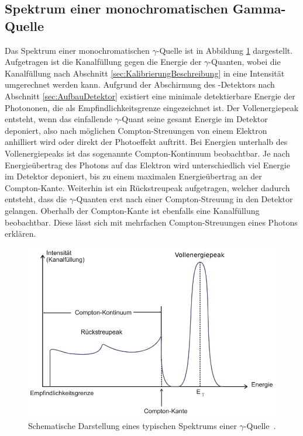 \subsection{Spektrum einer monochromatischen Gamma-Quelle}
\label{sec:TypischeQuelle}

Das Spektrum einer monochromatischen $\gamma$-Quelle ist in Abbildung \ref{fig:typisches-Spektrum}
dargestellt. Aufgetragen ist die Kanalfüllung gegen die Energie der $\gamma$-Quanten, wobei
die Kanalfüllung nach Abschnitt \ref{sec:KalibrierungBeschreibung} in eine Intensität umgerechnet werden kann.
Aufgrund der Abschirmung des -Detektors nach Abschnitt \ref{sec:AufbauDetektor} existiert eine
minimale detektierbare Energie der Photononen, die als Empfindlichkeitsgrenze eingezeichnet ist.
Der Vollenergiepeak entsteht, wenn das einfallende $\gamma$-Quant seine gesamt Energie im Detektor
deponiert, also nach möglichen Compton-Streuungen von einem Elektron anhilliert wird oder direkt der
Photoeffekt auftritt.
Bei Energien unterhalb des Vollenergiepeaks ist das sogenannte Compton-Kontinuum beobachtbar. Je nach
Energieübertrag des Photons auf das Elektron wird unterschiedlich viel Energie im Detektor deponiert,
bis zu einem maximalen Energieübertrag an der Compton-Kante.
Weiterhin ist ein Rückstreupeak aufgetragen, welcher dadurch entsteht, dass die $\gamma$-Quanten erst
nach einer Compton-Streuung in den Detektor gelangen.
Oberhalb der Compton-Kante ist ebenfalls eine Kanalfüllung beobachtbar. Diese lässt sich mit mehrfachen
Compton-Streuungen eines Photons erklären.

\begin{figure}
	\centering
	\includegraphics[width=.8\textwidth]{images/typisches-Spektrum.pdf}
	\caption{Schematische Darstellung eines typischen Spektrums einer $\gamma$-Quelle~\cite[23]{anleitung}.}
	\label{fig:typisches-Spektrum}
\end{figure}
